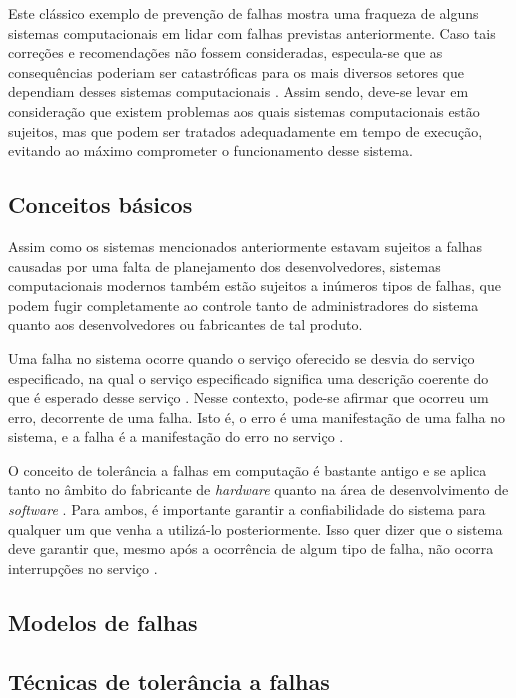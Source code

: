 \documentclass[
	12pt,				%
	a4paper,			%
	english,			%
	french,				%
	spanish,			%
	brazil				%
	]{abntex2}
\begin{document}
Este clássico exemplo de prevenção de falhas mostra uma fraqueza de alguns sistemas computacionais em lidar com falhas previstas anteriormente. Caso tais correções e recomendações não fossem consideradas, especula-se que as consequências poderiam ser catastróficas para os mais diversos setores que dependiam desses sistemas computacionais \cite{smith1997year}. Assim sendo, deve-se levar em consideração que existem problemas aos quais sistemas computacionais estão sujeitos, mas que podem ser tratados adequadamente em tempo de execução, evitando ao máximo comprometer o funcionamento desse sistema.

\subsection{Conceitos básicos}

Assim como os sistemas mencionados anteriormente estavam sujeitos a falhas causadas por uma falta de planejamento dos desenvolvedores, sistemas computacionais modernos também estão sujeitos a inúmeros tipos de falhas, que podem fugir completamente ao controle tanto de administradores do sistema quanto aos desenvolvedores ou fabricantes de tal produto.

Uma falha no sistema ocorre quando o serviço oferecido se desvia do serviço especificado, na qual o serviço especificado significa uma descrição coerente do que é esperado desse serviço \cite{laprie1985dependable}. Nesse contexto, pode-se afirmar que ocorreu um erro, decorrente de uma falha. Isto é, o erro é uma manifestação de uma falha no sistema, e a falha é a manifestação do erro no serviço \cite{laprie1985dependable}.

O conceito de tolerância a falhas em computação é bastante antigo e se aplica tanto no âmbito do fabricante de \emph{hardware} quanto na área de desenvolvimento de \emph{software} \cite{randell1975system}. Para ambos, é importante garantir a confiabilidade do sistema para qualquer um que venha a utilizá-lo posteriormente. Isso quer dizer que o sistema deve garantir que, mesmo após a ocorrência de algum tipo de falha, não ocorra interrupções no serviço \cite{bala2012fault}.


\subsection{Modelos de falhas}



\subsection{Técnicas de tolerância a falhas}
\end{document}
